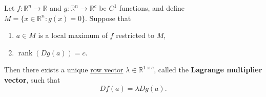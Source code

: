 	\begin{theorem}
	  \label{thm:lagrange-multipliers-theorem}
		Let $f:\mathbb{R}^n\to\mathbb{R}$ and $g:\mathbb{R}^n\to\mathbb{R}^c$ be $C^1$ functions, and define $M=\{ x\in\mathbb{R}^n:g(x)=0 \}$.
		Suppose that
		\begin{enumerate}
			\item $a\in M$ is a local maximum of $f$ restricted to $M$,
			\item $\operatorname{rank}(Dg(a))=c$.
		\end{enumerate}
		Then there exists a unique \hyperref[lin-def:row-vector]{row vector} $\lambda\in\mathbb{R}^{1\times c}$, called the \textbf{Lagrange multiplier vector}, such that
		\begin{equation}
			\label{lag_mul}
			Df(a)=\lambda Dg(a).
		\end{equation}
	\end{theorem}
